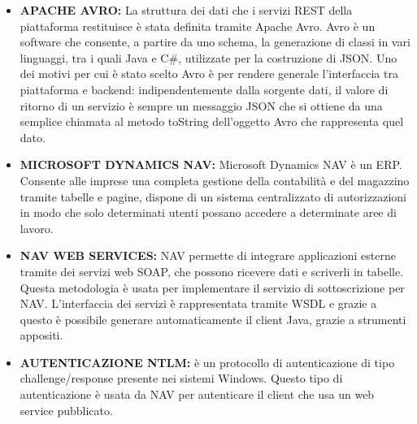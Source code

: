 \begin{itemize}
	\item \textbf{APACHE AVRO:} La struttura dei dati che i servizi REST della piattaforma restituisce è stata definita tramite Apache Avro. Avro è un software che consente, a partire da uno schema, la generazione di classi in vari linguaggi, tra i quali Java e C\#,  utilizzate per la costruzione di JSON. Uno dei motivi per cui è stato scelto Avro è per rendere generale l'interfaccia tra piattaforma e backend: indipendentemente dalla sorgente dati, il valore di ritorno di un servizio è sempre un messaggio JSON che si ottiene da una semplice chiamata al metodo toString dell'oggetto Avro che rappresenta quel dato.
	\item \textbf{MICROSOFT DYNAMICS NAV:} Microsoft Dynamics NAV è un ERP. Consente alle imprese una completa gestione della contabilità e del magazzino tramite tabelle e pagine, dispone di un sistema centralizzato di autorizzazioni in modo che solo determinati utenti possano accedere a determinate aree di lavoro.
	\item \textbf{NAV WEB SERVICES:} NAV permette di integrare applicazioni esterne tramite dei servizi web SOAP, che possono ricevere dati e scriverli in tabelle. Questa metodologia è usata per implementare il servizio di sottoscrizione per NAV. L’interfaccia dei servizi è rappresentata tramite WSDL e grazie a questo è possibile generare automaticamente il client Java, grazie a strumenti appositi.
	\item \textbf{AUTENTICAZIONE NTLM:} è un protocollo di autenticazione di tipo challenge/response presente nei sistemi Windows. Questo tipo di autenticazione è usata da NAV per autenticare il client che usa un web service pubblicato.
\end{itemize}
\clearpage
